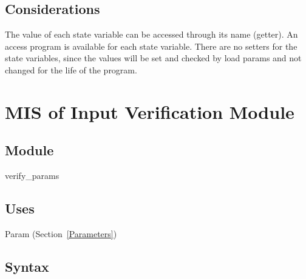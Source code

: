 \documentclass[12pt]{article}
\begin{document}
\begin{longtable*}[l]{l l}
\end{longtable*}

\subsection{Considerations}

The value of each state variable can be accessed through its name (getter).  An
access program is available for each state variable.  There are no setters for
the state variables, since the values will be set and checked by load params and
not changed for the life of the program.

\newpage

\section{MIS of Input Verification Module} \label{VerifyInput}

\subsection{Module}

verify\_params

\subsection{Uses}

Param (Section~\ref{Parameters})

\subsection{Syntax}
\end{document}
